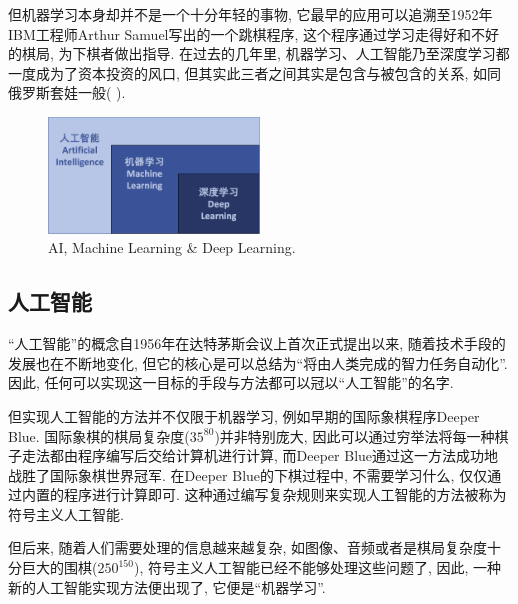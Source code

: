 \documentclass[lang=cn,11pt,a4paper]{elegantpaper}
\begin{document}
\par 但机器学习本身却并不是一个十分年轻的事物, 它最早的应用可以追溯至1952年IBM工程师Arthur Samuel写出的一个跳棋程序, 这个程序通过学习走得好和不好的棋局, 为下棋者做出指导\cite{AS1}\cite{AS2}. 在过去的几年里, 机器学习、人工智能乃至深度学习都一度成为了资本投资的风口, 但其实此三者之间其实是包含与被包含的关系, 如同俄罗斯套娃一般( ).
\begin{figure}[htbp]
	\centering
	\includegraphics[width=0.5\textwidth]{AI}
  	\caption{AI, Machine Learning \& Deep Learning.\label{fig:AI}}
\end{figure}
\subsection{人工智能}
\par “人工智能”的概念自1956年在达特茅斯会议\cite{Dartmouth}上首次正式提出以来, 随着技术手段的发展也在不断地变化, 但它的核心是可以总结为“将由人类完成的智力任务自动化”. 因此, 任何可以实现这一目标的手段与方法都可以冠以“人工智能”的名字. 
\par 但实现人工智能的方法并不仅限于机器学习, 例如早期的国际象棋程序Deeper Blue. 国际象棋的棋局复杂度($35^{80}$\cite{artic})并非特别庞大, 因此可以通过穷举法将每一种棋子走法都由程序编写后交给计算机进行计算, 而Deeper Blue通过这一方法成功地战胜了国际象棋世界冠军. 在Deeper Blue的下棋过程中, 不需要学习什么, 仅仅通过内置的程序进行计算即可. 这种通过编写复杂规则来实现人工智能的方法被称为符号主义人工智能. 
\par 但后来, 随着人们需要处理的信息越来越复杂, 如图像、音频或者是棋局复杂度十分巨大的围棋($250^{150}$\cite{artic}), 符号主义人工智能已经不能够处理这些问题了, 因此, 一种新的人工智能实现方法便出现了, 它便是“机器学习”.
\end{document}
